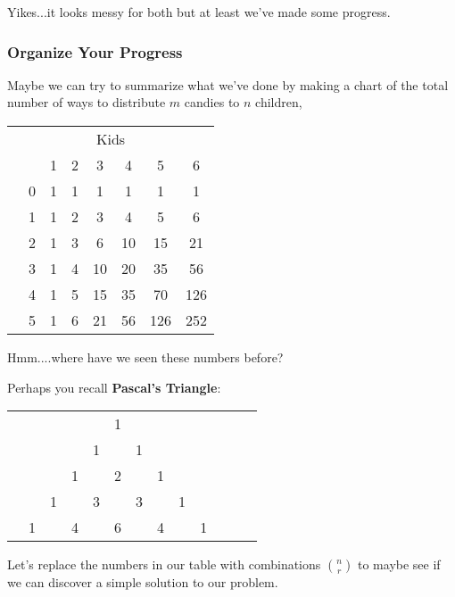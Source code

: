 Yikes...it looks messy for both but at least we've made some progress.

\subsubsection{Organize Your Progress}
Maybe we can try to summarize what we've done by making a chart of the total number of ways to distribute $m$ candies to $n$ children,


\begin{table}[H]
    \centering
    \begin{tabular}{cc|cccccc}
 && \multicolumn{5}{c}{Kids} \\
 && 1 & 2&3&4&5&6 \\
 \hline
 \hline
 & 0&1&1&1&1&1&1\\
  & 1& 1&2 &3&4&5&6\\
 \parbox[t]{2mm}{}& 2 &1&3&6&10&15&21\\
 & 3 &1&4&10&20&35&56\\
 & 4 &1&5&15&35&70&126 \\
 & 5 &1&6&21&56&126&252
    \end{tabular}
    \label{tab:candy}
\end{table}

Hmm....where have we seen these numbers before?

Perhaps you recall \textbf{Pascal's Triangle}:

\begin{center}
\begin{tabular}{ccccccccccccc}
 &&&&&1&&&&&&&\\
 &&&&1&&1&&&&&\\
 &&&1&&2&&1&&&\\
 &&1&&3&&3&&1&\\
 &1&&4&&6&&4&&1\\
\end{tabular}
\end{center}

Let's replace the numbers in our table with combinations $\binom{n}{r}$ to maybe see if we can discover a simple solution to our problem.


